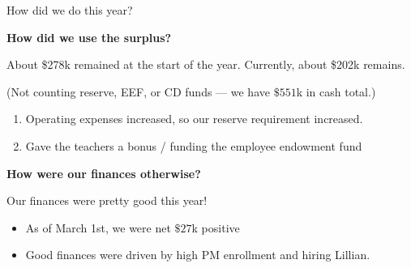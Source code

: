 \documentclass[8pt]{beamer}
\begin{document}
\begin{frame}{How did we do this year?}


\textbf{How did we use the surplus?}

About \$278k remained at the start of the year.
Currently, about \$202k remains.

(Not counting reserve, EEF, or CD funds --- we have $\$551$k in cash total.)

%
\begin{enumerate}
%
\item Operating expenses increased, so our reserve requirement increased.
\item Gave the teachers a bonus / funding the employee endowment fund
%
\end{enumerate}

\pause
\textbf{How were our finances otherwise?}

Our finances were pretty good this year!

%
\begin{itemize}
%
\item As of March 1st, we were net $\$27$k positive
\item Good finances were driven by high PM enrollment and hiring Lillian.
%
\end{itemize}
%


%
\end{frame}

\end{document}
